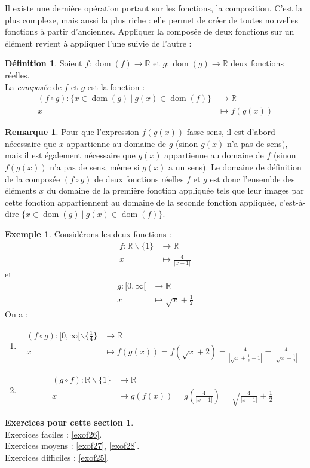 \documentclass[a4paper,13pt]{scrreprt}
\theoremstyle{plain}
\theoremstyle{definition}
\newtheorem{déf}[subsection]{Définition}
\newtheorem{exe}[subsection]{Exemple}
\newtheorem{rema}[subsection]{Remarque}
\newtheorem*{epcs}{Exercices pour cette section}
\newcommand{\rr}{\mathbb{R}}
\DeclareMathOperator{\dom}{dom}
\begin{document}
Il existe une dernière opération portant sur les fonctions, la composition. C'est la plus complexe, mais aussi la plus riche : elle permet de créer de toutes nouvelles fonctions à partir d'anciennes. Appliquer la composée de deux fonctions sur un élément revient à appliquer l'une suivie de l'autre :
\begin{déf}
	Soient $f : \dom (f) \to \rr$ et $g : \dom (g) \to \rr$ deux fonctions réelles. \\
	La \emph{composée} de $f$ et $g$ est la fonction : \begin{align*}
	(f \circ g) : \{x \in \dom (g)~|~g(x) \in \dom (f)\} &\to \rr \\
	x &\mapsto f(g(x))
	\end{align*}
\end{déf}
\begin{rema}
	Pour que l'expression $f(g(x))$ fasse sens, il est d'abord nécessaire que $x$ appartienne au domaine de $g$ (sinon $g(x)$ n'a pas de sens), mais il est également nécessaire que $g(x)$ appartienne au domaine de $f$ (sinon $f(g(x))$ n'a pas de sens, même si $g(x)$ a un sens). Le domaine de définition de la composée $(f \circ g)$ de deux fonctions réelles $f$ et $g$ est donc l'ensemble des éléments $x$ du domaine de la première fonction appliquée tels que leur images par cette fonction appartiennent au domaine de la seconde fonction appliquée, c'est-à-dire $\{x \in \dom (g)~|~g(x) \in \dom (f)\}$.
\end{rema}
\begin{exe}
	Considérons les deux fonctions : \begin{align*}
	f : \rr \backslash \{1\} &\to \rr \\
	x &\mapsto \frac{4}{|x-1|}
	\end{align*}
	et
	\begin{align*}
	g : [0,\infty[ &\to \rr \\
	x &\mapsto \sqrt{x}+\frac{1}{2}
	\end{align*}
	On a :
	\begin{enumerate}
		\item \begin{align*}
		(f \circ g) : [0,\infty[ \backslash \{\frac{1}{4}\} &\to \rr \\
		x &\mapsto f(g(x))= f(\sqrt{x}+2) = \frac{4}{|\sqrt{x}+\frac{1}{2}-1|}= \frac{4}{|\sqrt{x}-\frac{1}{2}|}
		\end{align*}
		\item \begin{align*}
		(g \circ f) : \rr \backslash \{1\} &\to \rr \\
		x &\mapsto g(f(x))= g\left(\frac{4}{|x-1|}\right) = \sqrt{\frac{4}{|x-1|}}+\frac{1}{2}
		\end{align*}
	\end{enumerate}
\end{exe}
\newpage
\begin{epcs}
	~~\\
	Exercices faciles : \ref{exof26}.\\
	Exercices moyens : \ref{exof27}, \ref{exof28}. \\
	Exercices difficiles : \ref{exof25}.
\end{epcs}
\end{document}
